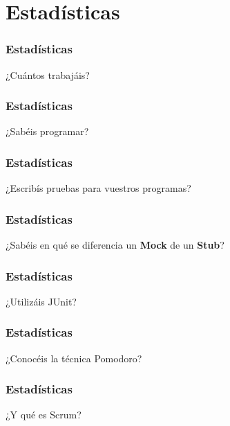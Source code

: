 \section{Estadísticas}

\begin{frame}
  \frametitle{Estadísticas}

  \begin{center}
    {\Huge ¿Cuántos trabajáis?}
  \end{center}
\end{frame}

\begin{frame}
  \frametitle{Estadísticas}

  \begin{center}
    {\Huge ¿Sabéis programar?}
  \end{center}
\end{frame}

\begin{frame}
  \frametitle{Estadísticas}

  \begin{center}
    {\Huge ¿Escribís pruebas para vuestros programas?}
  \end{center}
\end{frame}

\begin{frame}
  \frametitle{Estadísticas}

  \begin{center}
    {\Huge ¿Sabéis en qué se diferencia un \textbf{Mock} de un \textbf{Stub}?}
  \end{center}
\end{frame}

\begin{frame}
  \frametitle{Estadísticas}

  \begin{center}
    {\Huge ¿Utilizáis JUnit?}
  \end{center}
\end{frame}

\begin{frame}
  \frametitle{Estadísticas}

  \begin{center}
    {\Huge ¿Conocéis la técnica Pomodoro?}
  \end{center}
\end{frame}

\begin{frame}
  \frametitle{Estadísticas}

  \begin{center}
    {\Huge ¿Y qué es Scrum?}
  \end{center}
\end{frame}

